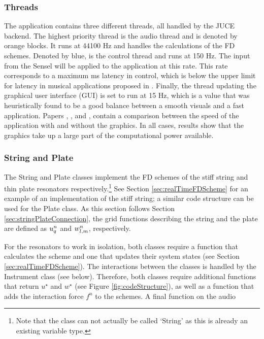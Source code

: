 \subsubsection{Threads}
The application contains three different threads, all handled by the JUCE backend. The highest priority thread is the audio thread and is denoted by orange blocks. It runs at 44100 Hz and handles the calculations of the FD schemes. Denoted by blue, is the control thread and runs at 150 Hz. The input from the Sensel will be applied to the application at this rate. This rate corresponds to a maximum  ms latency in control, which is below the upper limit for latency in musical applications proposed in \cite{Wessel2002}. Finally, the thread updating the graphical user interface (GUI) is set to run at 15 Hz, which is a value that was heuristically found to be a good balance between a smooth visuals and a fast application. %
Papers \citeP[A], \citeP[C], and \citeP[H], contain a comparison between the speed of the application with and without the graphics. In all cases, results show that the graphics take up a large part of the computational power available.

\subsubsection{String and Plate}
The String and Plate classes implement the FD schemes of the stiff string and thin plate resonators respectively.\footnote{Note that the class can not actually be called `String' as this is already an existing variable type.} See Section \ref{sec:realTimeFDScheme} for an example of an implementation of the stiff string; a similar code structure can be used for the Plate class. As this section follows Section \ref{sec:stringPlateConnection}, the grid functions describing the string and the plate are defined as $u_q^n$ and $w_{l,m}^n$, respectively. 

For the resonators to work in isolation, both classes require a function that calculates the scheme and one that updates their system states (see Section \ref{sec:realTimeFDScheme}). The interactions between the classes is handled by the Instrument class (see below). Therefore, both classes require additional functions that return $u^\star$ and $w^\star$ (see Figure \ref{fig:codeStructure}), as well as a function that adds the interaction force $f^n$ to the schemes. A final function on the audio  

